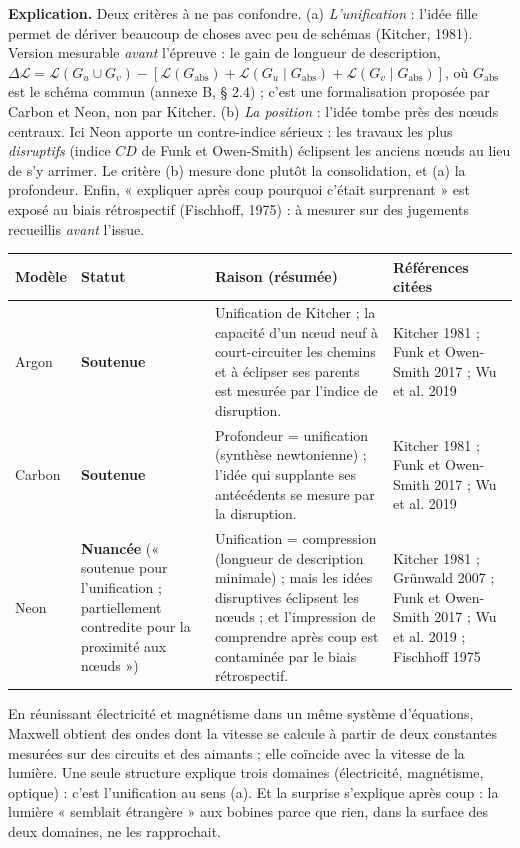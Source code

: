 \documentclass[a4paper,11pt]{article}
\makeatletter
\newenvironment{avis}{\small\renewcommand{\arraystretch}{1.15}%
\begin{longtable}{@{}>{\raggedright\arraybackslash}p{1.35cm}>{\raggedright\arraybackslash}p{2.45cm}>{\raggedright\arraybackslash}p{7.15cm}>{\raggedright\arraybackslash}p{4.4cm}@{}}
\toprule \textbf{Modèle} & \textbf{Statut} & \textbf{Raison (résumée)} & \textbf{Références citées}\\ \midrule \endhead
\bottomrule \endfoot}{\end{longtable}}
\newcommand{\st}[1]{\textbf{#1}}
\makeatother
\begin{document}
\textbf{Explication.} Deux critères à ne pas confondre. (a) \emph{L'unification} : l'idée fille permet de dériver beaucoup de choses avec peu de schémas (Kitcher, 1981). Version mesurable \emph{avant} l'épreuve : le gain de longueur de description, $\Delta\mathcal L = \mathcal L(G_u\cup G_v) - [\mathcal L(G_{\text{abs}}) + \mathcal L(G_u\mid G_{\text{abs}})+\mathcal L(G_v\mid G_{\text{abs}})]$, où $G_{\text{abs}}$ est le schéma commun (annexe B, § 2.4) ; c'est une formalisation proposée par Carbon et Neon, non par Kitcher. (b) \emph{La position} : l'idée tombe près des nœuds centraux. Ici Neon apporte un contre-indice sérieux : les travaux les plus \emph{disruptifs} (indice $CD$ de Funk et Owen-Smith) éclipsent les anciens nœuds au lieu de s'y arrimer. Le critère (b) mesure donc plutôt la consolidation, et (a) la profondeur. Enfin, « expliquer après coup pourquoi c'était surprenant » est exposé au biais rétrospectif (Fischhoff, 1975) : à mesurer sur des jugements recueillis \emph{avant} l'issue.

\begin{avis}
Argon & \st{Soutenue} & Unification de Kitcher ; la capacité d'un nœud neuf à court-circuiter les chemins et à éclipser ses parents est mesurée par l'indice de disruption. & Kitcher 1981 ; Funk et Owen-Smith 2017 ; Wu et al. 2019\\ \midrule
Carbon & \st{Soutenue} & Profondeur = unification (synthèse newtonienne) ; l'idée qui supplante ses antécédents se mesure par la disruption. & Kitcher 1981 ; Funk et Owen-Smith 2017 ; Wu et al. 2019\\ \midrule
Neon & \st{Nuancée} (« soutenue pour l'unification ; partiellement contredite pour la proximité aux nœuds ») & Unification = compression (longueur de description minimale) ; mais les idées disruptives éclipsent les nœuds ; et l'impression de comprendre après coup est contaminée par le biais rétrospectif. & Kitcher 1981 ; Grünwald 2007 ; Funk et Owen-Smith 2017 ; Wu et al. 2019 ; Fischhoff 1975\\
\end{avis}

\begin{exemple}
En réunissant électricité et magnétisme dans un même système d'équations, Maxwell obtient des ondes dont la vitesse se calcule à partir de deux constantes mesurées sur des circuits et des aimants ; elle coïncide avec la vitesse de la lumière. Une seule structure explique trois domaines (électricité, magnétisme, optique) : c'est l'unification au sens (a). Et la surprise s'explique après coup : la lumière « semblait étrangère » aux bobines parce que rien, dans la surface des deux domaines, ne les rapprochait.
\end{exemple}
\end{document}
